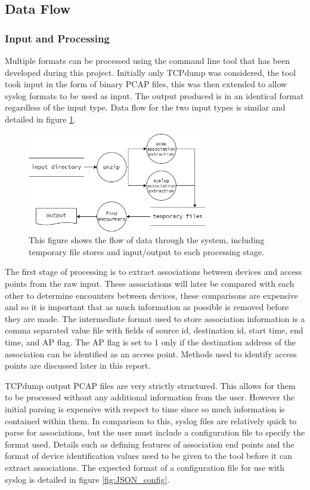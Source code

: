 \subsection{Data Flow}

\subsubsection{Input and Processing}
Multiple formats can be processed using the command line tool that has been developed during this project. Initially only TCPdump was considered, the tool took input in the form of binary PCAP files, this was then extended to allow syslog formats to be used as input. The output produced is in an identical format regardless of the input type. Data flow for the two input types is similar and detailed in figure \ref{fig:df_dia}.\newline
\begin{figure}[h]
    \centering
    \includegraphics[width=0.7\textwidth]{df_diagram.png}
    \caption{This figure shows the flow of data through the system, including temporary file stores and input/output to each processing stage.}
    \label{fig:df_dia}
\end{figure}

The first stage of processing is to extract associations between devices and access points from the raw input. These associations will later be compared with each other to determine encounters between devices, these comparisons are expensive and so it is important that as much information as possible is removed before they are made. The intermediate format used to store association information is  a comma separated value file with fields of source id, destination id, start time, end time, and AP flag. The AP flag is set to 1 only if the destination address of the association can be identified as an access point. Methods used to identify access points are discussed later in this report.

TCPdump output PCAP files are very strictly structured. This allows for them to be processed without any additional information from the user. However the initial parsing is expensive with respect to time since so much information is contained within them. In comparison to this, syslog files are relatively quick to parse for associations, but the user must include a configuration file to specify the format used. Details such as defining features of association end points and the format of device identification values need to be given to the tool before it can extract associations. The expected format of a configuration file for use with syslog is detailed in figure \ref{fig:JSON_config}.\newline

